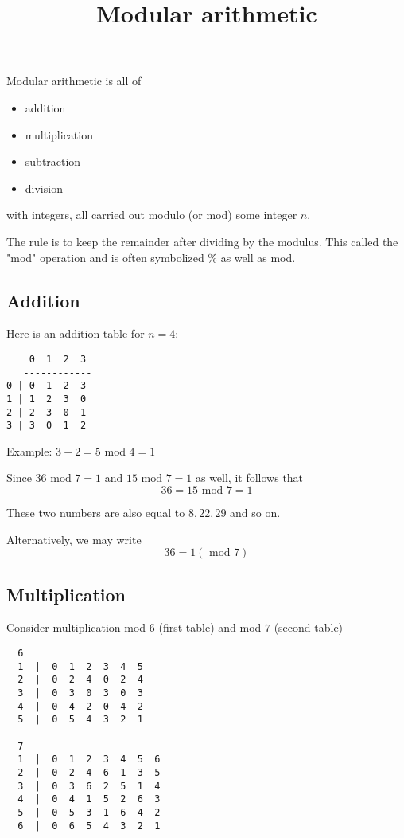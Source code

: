 \documentclass[11pt, oneside]{article}
\title{Modular arithmetic}
\date{}
\begin{document}
\maketitle
\Large

Modular arithmetic is all of

\begin{itemize}
	\item addition
	\item multiplication
	\item subtraction
	\item division
\end{itemize}

with integers, all carried out modulo (or mod) some integer $n$. 

The rule is to keep the remainder after dividing by the modulus.  This called the "mod" operation and is often symbolized \% as well as mod.

\subsection*{Addition}

Here is an addition table for $n = 4$:

\newpage

\begin{verbatim}
    0  1  2  3  
   ------------
0 | 0  1  2  3
1 | 1  2  3  0
2 | 2  3  0  1
3 | 3  0  1  2
\end{verbatim}

Example:  $3 + 2 = 5  \text{ mod } 4 = 1$

Since $36  \text{ mod } 7 = 1$ and $15 \text{ mod } 7 = 1$ as well, it follows that
\[ 36 = 15 \text{ mod } 7 = 1 \]

These two numbers are also equal to $8, 22, 29$ and so on.

Alternatively, we may write
\[ 36 = 1 (\text{ mod } 7) \]

\subsection*{Multiplication}

Consider multiplication mod $6$ (first table) and mod $7$ (second table)
\begin{verbatim}
  6
  1  |  0  1  2  3  4  5
  2  |  0  2  4  0  2  4
  3  |  0  3  0  3  0  3
  4  |  0  4  2  0  4  2
  5  |  0  5  4  3  2  1

  7
  1  |  0  1  2  3  4  5  6
  2  |  0  2  4  6  1  3  5
  3  |  0  3  6  2  5  1  4
  4  |  0  4  1  5  2  6  3
  5  |  0  5  3  1  6  4  2
  6  |  0  6  5  4  3  2  1
\end{verbatim}
\end{document}
